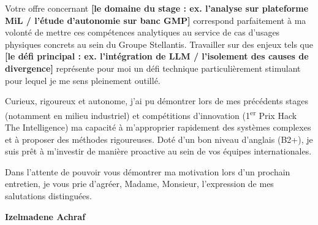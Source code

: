 \documentclass[10pt,a4paper]{altacv}
\begin{document}
\vspace{0.4cm}

Votre offre concernant \textcolor{StellantisRed}{\textbf{[le domaine du stage : ex. l'analyse sur plateforme MiL / l'étude d'autonomie sur banc GMP]}} correspond parfaitement à ma volonté de mettre ces compétences analytiques au service de cas d'usages physiques concrets au sein du Groupe Stellantis. Travailler sur des enjeux tels que \textcolor{StellantisRed}{\textbf{[le défi principal : ex. l'intégration de LLM / l'isolement des causes de divergence]}} représente pour moi un défi technique particulièrement stimulant pour lequel je me sens pleinement outillé.

\vspace{0.4cm}

Curieux, rigoureux et autonome, j'ai pu démontrer lors de mes précédents stages (notamment en milieu industriel) et compétitions d'innovation (1\textsuperscript{er} Prix Hack The Intelligence) ma capacité à m'approprier rapidement des systèmes complexes et à proposer des méthodes rigoureuses. Doté d'un bon niveau d'anglais (B2+), je suis prêt à m'investir de manière proactive au sein de vos équipes internationales.

\vspace{0.4cm}

Dans l'attente de pouvoir vous démontrer ma motivation lors d'un prochain entretien, je vous prie d'agréer, Madame, Monsieur, l'expression de mes salutations distinguées.

\vspace{0.5cm}

\vfill

\begin{flushright}
  \Large\color{emphasis}\textbf{Izelmadene Achraf}
\end{flushright}
\end{document}
